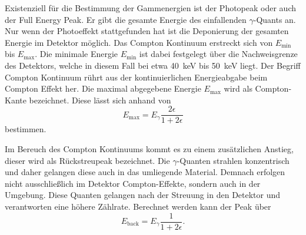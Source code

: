 Existenziell für die Bestimmung der Gammenergien ist der Photopeak oder auch der Full Energy Peak.
Er gibt die gesamte Energie des einfallenden $\gamma$-Quants an. Nur wenn der Photoeffekt stattgefunden hat ist die Deponierung der 
gesamten Energie im Detektor möglich. 
Das Compton Kontinuum erstreckt sich von $E_{\text{min}}$ bis $E_{\text{max}}$. Die minimale Energie $E_{\text{min}}$ ist dabei festgelegt über
die Nachweisgrenze des Detektors, welche in diesem Fall bei etwa \qty{40}{\kilo\eV} bis \qty{50}{\kilo\eV} liegt. Der Begriff Compton
Kontinuum rührt aus der kontinuierlichen Energieabgabe beim Compton Effekt her.
Die maximal abgegebene Energie $E_{\text{max}}$ wird als Compton-Kante bezeichnet.
Diese lässt sich anhand von
\begin{equation}
    E_{\text{max}} = E_\gamma \frac{2 \epsilon}{1+2\epsilon}
\end{equation}
bestimmen.

Im Bereuch des Compton Kontinuums kommt es zu einem zusätzlichen Anstieg, dieser wird als Rückstreupeak
bezeichnet. Die $\gamma$-Quanten strahlen konzentrisch und daher gelangen diese auch in das umliegende Material.
Demnach erfolgen nicht ausschließlich im Detektor Compton-Effekte, sondern auch in der Umgebung. Diese Quanten gelangen nach der
Streuung in den Detektor und verantworten eine höhere Zählrate.
Berechnet werden kann der Peak über
\begin{equation}
    E_{\text{back}} = E_\gamma \frac{1}{1+2\epsilon}.
\end{equation}



